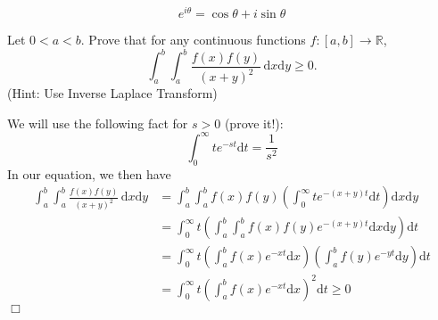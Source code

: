 $$e^{i \theta} = \cos {\theta} + i \sin {\theta} $$

\begin{problem}[B][9][MIT 18.A34]
    Let $0 < a < b$. Prove that for any continuous functions $f \colon [a,b] \rightarrow \mathbb{R}$, 
    \[\int_{a}^{b}\int_{a}^{b} \frac{f(x)f(y)}{(x+y)^2} \, \mathrm{d}x \mathrm{d}y \geq 0.\]
    (Hint: Use Inverse Laplace Transform)
\end{problem}

\begin{solution}
    We will use the following fact for $s>0$ (prove it!):
    $$ \int_0^{\infty} te^{-st} \mathrm{d}t = \frac{1}{s^2}$$
    In our equation, we then have
    \begin{align*}
        \int_{a}^{b}\int_{a}^{b} \frac{f(x)f(y)}{(x+y)^2} \, \mathrm{d}x \mathrm{d}y &= \int_{a}^{b}\int_{a}^{b} f(x)f(y) \left( \int_{0}^{\infty} te^{-(x+y)t} \mathrm{d}t \right) \mathrm{d}x \mathrm{d}y \\
        &= \int_{0}^{\infty} t \left(  \int_{a}^{b}\int_{a}^{b} f(x)f(y) e^{-(x+y)t} \mathrm{d}x \mathrm{d}y \right)  \mathrm{d}t \\
        &= \int_{0}^{\infty} t \left(  \int_{a}^{b} f(x) e^{-xt} \mathrm{d}x\right) \left(  \int_{a}^{b} f(y) e^{-yt} \mathrm{d}y\right)  \mathrm{d}t \\
        &= \int_{0}^{\infty} t \left(  \int_{a}^{b} f(x) e^{-xt} \mathrm{d}x\right)^2 \mathrm{d}t \geq 0
    \end{align*}
    $\Box$
\end{solution}


